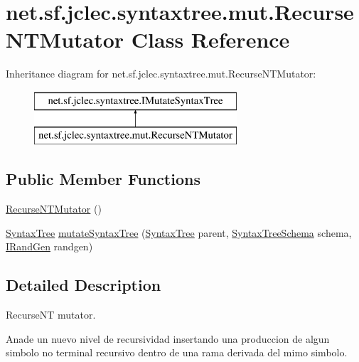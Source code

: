 \hypertarget{classnet_1_1sf_1_1jclec_1_1syntaxtree_1_1mut_1_1_recurse_n_t_mutator}{\section{net.\-sf.\-jclec.\-syntaxtree.\-mut.\-Recurse\-N\-T\-Mutator Class Reference}
\label{classnet_1_1sf_1_1jclec_1_1syntaxtree_1_1mut_1_1_recurse_n_t_mutator}
}
Inheritance diagram for net.\-sf.\-jclec.\-syntaxtree.\-mut.\-Recurse\-N\-T\-Mutator\-:\begin{figure}[H]
\begin{center}
\leavevmode
\includegraphics[height=2.000000cm]{classnet_1_1sf_1_1jclec_1_1syntaxtree_1_1mut_1_1_recurse_n_t_mutator}
\end{center}
\end{figure}
\subsection*{Public Member Functions}
\begin{DoxyCompactItemize}
\item 
\hyperlink{classnet_1_1sf_1_1jclec_1_1syntaxtree_1_1mut_1_1_recurse_n_t_mutator_abd2224b4d461856d76c85c271b7bdb41}{Recurse\-N\-T\-Mutator} ()
\item 
\hyperlink{classnet_1_1sf_1_1jclec_1_1syntaxtree_1_1_syntax_tree}{Syntax\-Tree} \hyperlink{classnet_1_1sf_1_1jclec_1_1syntaxtree_1_1mut_1_1_recurse_n_t_mutator_a1e89749fea7e84fadd8709c4045fcab7}{mutate\-Syntax\-Tree} (\hyperlink{classnet_1_1sf_1_1jclec_1_1syntaxtree_1_1_syntax_tree}{Syntax\-Tree} parent, \hyperlink{classnet_1_1sf_1_1jclec_1_1syntaxtree_1_1_syntax_tree_schema}{Syntax\-Tree\-Schema} schema, \hyperlink{interfacenet_1_1sf_1_1jclec_1_1util_1_1random_1_1_i_rand_gen}{I\-Rand\-Gen} randgen)
\end{DoxyCompactItemize}


\subsection{Detailed Description}
Recurse\-N\-T mutator.

Anade un nuevo nivel de recursividad insertando una produccion de algun simbolo no terminal recursivo dentro de una rama derivada del mimo simbolo.


